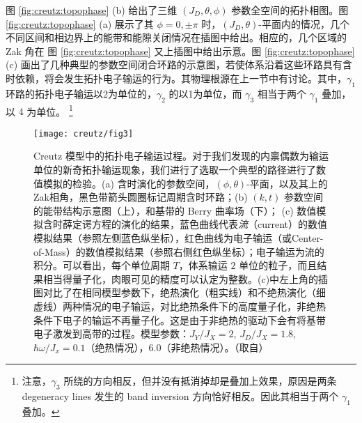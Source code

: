 图 \ref{fig:creutz:topophase} (b) 给出了三维 $(J_D, \theta, \phi)$ 参数全空间的拓扑相图。图 \ref{fig:creutz:topophase} (a) 展示了其 $\phi=0,\pm\pi$ 时，$(J_D, \theta)$-平面内的情况，几个不同区间和相边界上的能带和能隙关闭情况在插图中给出。相应的，几个区域的 Zak 角在 图 \ref{fig:creutz:topophase} 又上插图中给出示意。图 \ref{fig:creutz:topophase} (c) 画出了几种典型的参数空间闭合环路的示意图，若使体系沿着这些环路具有含时依赖，将会发生拓扑电子输运的行为。其物理根源在上一节中有讨论。其中，$\gamma_1$ 环路的拓扑电子输运以2为单位的，$\gamma_2$ 的以1为单位，而 $\gamma_3$ 相当于两个 $\gamma_1$ 叠加，以 $4$ 为单位。
\footnote{注意，$\gamma_3$ 所绕的方向相反，但并没有抵消掉却是叠加上效果，原因是两条 degeneracy lines 发生的 band inversion 方向恰好相反。因此其相当于两个 $\gamma_1$ 叠加。}


\begin{figure}[!htb]
\centering
\texttt{[image: creutz/fig3]}
\caption{Creutz 模型中的拓扑电子输运过程。对于我们发现的内禀偶数为输运单位的新奇拓扑输运现象，我们进行了选取一个典型的路径进行了数值模拟的检验。(a) 含时演化的参数空间，$(\phi, \theta)$-平面，以及其上的Zak相角，黑色带箭头圆圈标记周期含时环路；(b) $(k,t)$ 参数空间的能带结构示意图（上），和基带的 Berry 曲率场（下）； (c) 数值模拟含时薛定谔方程的演化的结果，蓝色曲线代表\textit{流}（current）的数值模拟结果（参照左侧蓝色纵坐标），红色曲线为电子输运（或Center-of-Mass）的数值模拟结果（参照右侧红色纵坐标）；电子输运为流的积分。可以看出，每个单位周期 $T$，体系输运 $2$ 单位的粒子，而且结果相当得量子化，肉眼可见的精度可以认定为整数。(c)中左上角的插图对比了在相同模型参数下，绝热演化（粗实线）和不绝热演化（细虚线）两种情况的电子输运，对比绝热条件下的高度量子化，非绝热条件下电子的输运不再量子化。这是由于非绝热的驱动下会有将基带电子激发到高带的过程。模型参数：$J_Y/J_X=2$, $J_D/J_X=1.8$, $\hbar\omega/J_x=0.1$（绝热情况），$6.0$（非绝热情况）。（取自）}
\label{fig:creutz:chargepumps}
\end{figure}

